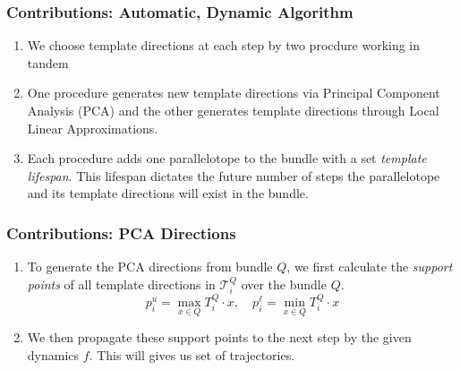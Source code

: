 \documentclass{beamer}
\newcommand{\T}{\mathcal{T}}
\begin{document}
\begin{frame}
  \frametitle{\textbf{Contributions:} Automatic, Dynamic Algorithm}
  \begin{enumerate}
    \item We choose template directions at each step by two procdure working in tandem
    \item One procedure generates new template directions via Principal Component Analysis (PCA) and the other generates template directions through Local Linear Approximations.
    \item Each procedure adds one parallelotope to the bundle with a set \emph{template lifespan}. This lifespan dictates the future number of steps the parallelotope and its template directions will exist in the bundle.
  \end{enumerate}
\end{frame}


\begin{frame}
    \frametitle{\textbf{Contributions:} PCA Directions}
    \begin{enumerate}
      \item To generate the PCA directions from bundle $Q$, we first calculate the \emph{support points} of all template directions in $\T^Q_i$ over the bundle $Q$.
      \[ p_{i}^u = \max_{x \in Q} T_i^Q \cdot x, \quad  p_{i}^\ell = \min_{x \in Q} T_i^Q \cdot x \]
      \item We then propagate these support points to the next step by the given dynamics $f$. This will gives us set of trajectories.
    \end{enumerate}
\end{frame}
\end{document}

